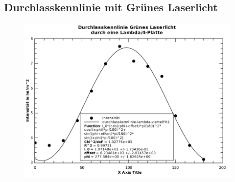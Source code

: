 \subsection{Durchlasskennlinie mit Gr\"unes Laserlicht}

\begin{figure}[H]
    \centering
    \includegraphics[width=.6\linewidth]{images/aufgabe-6.pdf}
    \caption{}
\end{figure}

